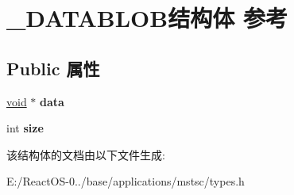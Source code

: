 \hypertarget{struct___d_a_t_a_b_l_o_b}{}\section{\+\_\+\+D\+A\+T\+A\+B\+L\+O\+B结构体 参考}
\label{struct___d_a_t_a_b_l_o_b}
\subsection*{Public 属性}
\begin{DoxyCompactItemize}
\item 
\mbox{\label{struct___d_a_t_a_b_l_o_b_a426ae9b81794e66d5f3c653d143bb67d}} 
\hyperlink{interfacevoid}{void} $\ast$ {\bfseries data}
\item 
\mbox{\label{struct___d_a_t_a_b_l_o_b_aa5c73a27e8f053ad709f090d3baaa1ac}} 
int {\bfseries size}
\end{DoxyCompactItemize}


该结构体的文档由以下文件生成\+:\begin{DoxyCompactItemize}
\item 
E\+:/\+React\+O\+S-\/0../base/applications/mstsc/types.\+h\end{DoxyCompactItemize}

